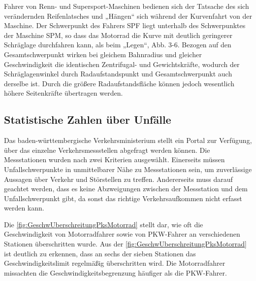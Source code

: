 Fahrer von Renn- und Supersport-Maschinen bedienen sich der Tatsache des sich verändernden Reifenlatsches und „Hängen“ sich während der Kurvenfahrt von der Maschine. Der Schwerpunkt des Fahrers SPF liegt unterhalb des Schwerpunktes der Maschine SPM, so dass das Motorrad die Kurve mit deutlich geringerer Schräglage durchfahren kann, als beim „Legen“, Abb. 3-6. Bezogen auf den Gesamtschwerpunkt wirken bei gleichem Bahnradius und gleicher Geschwindigkeit die identischen Zentrifugal- und Gewichtskräfte, wodurch der Schräglagenwinkel durch Radaufstandspunkt und Gesamtschwerpunkt auch derselbe ist. Durch die größere Radaufstandsfläche können jedoch wesentlich höhere Seitenkräfte übertragen werden.


\subsection{Statistische Zahlen über Unfälle}
Das baden-württembergische Verkehrsministerium stellt ein Portal zur Verfügung, über das einzelne Verkehrsmessstellen abgefragt werden können. Die Messstationen wurden nach zwei Kriterien ausgewählt. Einerseits müssen Unfallschwerpunkte in unmittelbarer Nähe zu Messstationen sein, um zuverlässige Aussagen über Verkehr und Störstellen zu treffen.
Andererseits muss darauf geachtet werden, dass es keine Abzweigungen zwischen der Messstation und dem Unfallschwerpunkt gibt, da sonst das richtige Verkehrsaufkommen nicht erfasst werden kann.

Die \autoref{fig:GeschwUberschreitungPksMotorrad} stellt dar, wie oft die Geschwindigkeit von Motorradfahrer sowie von PKW-Fahrer an verschiedenen Stationen überschritten wurde. Aus der \autoref{fig:GeschwUberschreitungPksMotorrad} ist deutlich zu erkennen, dass an sechs der sieben Stationen das Geschwindigkeitslimit regelmäßig überschritten wird.
Die Motorradfahrer missachten die Geschwindigkeitsbegrenzung häufiger als die PKW-Fahrer. \cite{Maire2020}


